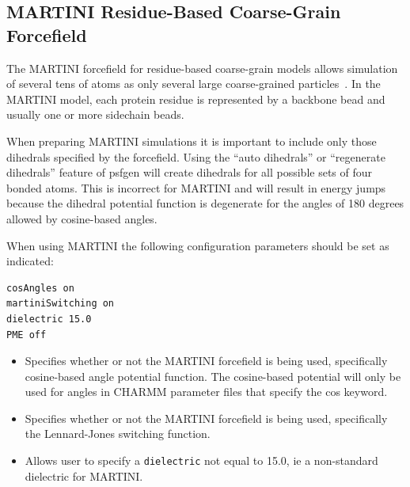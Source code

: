 \subsection{MARTINI Residue-Based Coarse-Grain Forcefield}

The MARTINI forcefield for residue-based coarse-grain models allows simulation of several tens of atoms as only several large coarse-grained particles~\cite{MARR2004, MARR2007, MONT2008}.  In the MARTINI model, each protein residue is represented by a backbone bead and usually one or more sidechain beads.  

When preparing MARTINI simulations it is important to include only those
dihedrals specified by the forcefield.  Using the ``auto dihedrals'' or 
``regenerate dihedrals'' feature of psfgen will create dihedrals for all
possible sets of four bonded atoms.  This is incorrect for MARTINI and
will result in energy jumps because the dihedral potential function is
degenerate for the angles of 180 degrees allowed by cosine-based angles.

When using MARTINI the following configuration parameters should be set as indicated:

\begin{verbatim}
cosAngles on
martiniSwitching on
dielectric 15.0
PME off
\end{verbatim}

\begin{itemize}

\item
{}
{Specifies whether or not the MARTINI forcefield is being used, specifically cosine-based angle potential function.
The cosine-based potential will only be used for angles in CHARMM parameter files that specify the cos keyword.} 

\item
{}
{Specifies whether or not the MARTINI forcefield is being used, specifically the Lennard-Jones switching function.} 

\item
{}
{Allows user to specify a {\tt dielectric} not equal to 15.0, ie a non-standard dielectric for MARTINI.}

\end{itemize}


